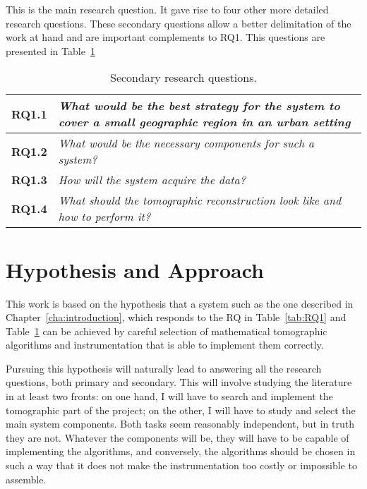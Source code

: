 This is the main research question. It gave rise to four other more
detailed research questions. These secondary questions allow a better
delimitation of the work at hand and are important complements to RQ1.
This questions are presented in Table~\ref{tab:sec_RQ}

\begin{table}[htpb]
    \centering
    \label{tab:sec_RQ}
    \caption{Secondary research questions.}
    \begin{tabularx}{0.8\textwidth}{cX}
        \toprule
        \textbf{RQ1.1}&\emph{ What would be the best strategy
        for the system to cover a small geographic region in an urban
        setting }\\
        \midrule
        \textbf{RQ1.2}&\emph{ What would be the necessary
        components for such a system? }\\
        \midrule
        \textbf{RQ1.3}&\emph{ How will the system acquire the
        data? }\\
        \midrule
        \textbf{RQ1.4}&\emph{ What should the tomographic
        reconstruction look like and how to perform it? }\\
        \bottomrule
    \end{tabularx}
\end{table}



\section{Hypothesis and Approach}%
\label{sec:hypothesis_and_approach}

This work is based on the hypothesis that a system such as the one
described in Chapter~\ref{cha:introduction}, which responds to the
\gls{RQ} in Table~\ref{tab:RQ1} and Table~\ref{tab:sec_RQ} can be
achieved by careful selection of mathematical tomographic algorithms and
instrumentation that is able to implement them correctly.

Pursuing this hypothesis will naturally lead to answering all the
research questions, both primary and secondary. This will involve
studying the literature in at least two fronts: on one hand, I will have
to search and implement the tomographic part of the project; on the
other, I will have to study and select the main system components. Both
tasks seem reasonably independent, but in truth they are not. Whatever
the components will be, they will have to be capable of implementing the
algorithms, and conversely, the algorithms should be chosen in such a
way that it does not make the instrumentation too costly or impossible
to assemble.

